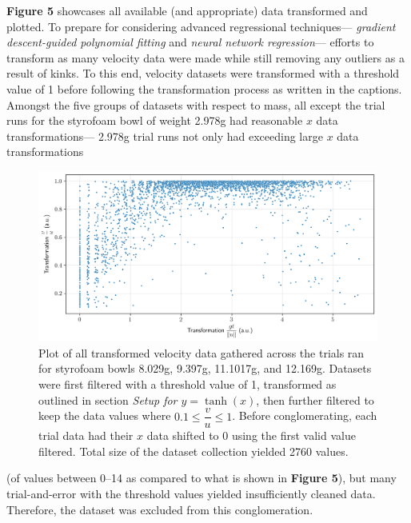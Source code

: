\documentclass[12pt]{article}
\begin{document}
\begin{multicols}{2}
\textbf{Figure 5} showcases all available (and appropriate) data transformed and plotted.
To prepare for considering advanced regressional techniques--- \textit{gradient descent-guided polynomial fitting} and \textit{neural network regression}---
efforts to transform as many velocity data were made while still removing any outliers as a result of kinks.
To this end, velocity datasets were transformed with a threshold value of 1 before following the transformation process as written in the captions.
Amongst the five groups of datasets with respect to mass, all except the trial runs for the styrofoam bowl of weight 2.978g had reasonable $x$ data transformations---
2.978g trial runs not only had exceeding large $x$ data transformations
\begin{figure}[H]
    \centering
    \includegraphics[width=0.98\linewidth]{figs/figure5.png}
    \caption{
        Plot of all transformed velocity data gathered across the trials ran for styrofoam bowls 8.029g, 9.397g, 11.1017g, and 12.169g.
        Datasets were first filtered with a threshold value of 1, transformed as outlined in section \textit{Setup for $y=\tanh(x)$},
        then further filtered to keep the data values where $0.1\leq\dfrac{v}{u}\leq1$. 
        Before conglomerating, each trial data had their $x$ data shifted to 0 using the first valid value filtered.
        Total size of the dataset collection yielded 2760 values.
    }
    \label{fig:5}
\end{figure}
\noindent
(of values between 0--14 as compared to what is shown in \textbf{Figure 5}),
but many trial-and-error with the threshold values yielded insufficiently cleaned data.
Therefore, the dataset was excluded from this conglomeration.


\end{multicols}
\end{document}
